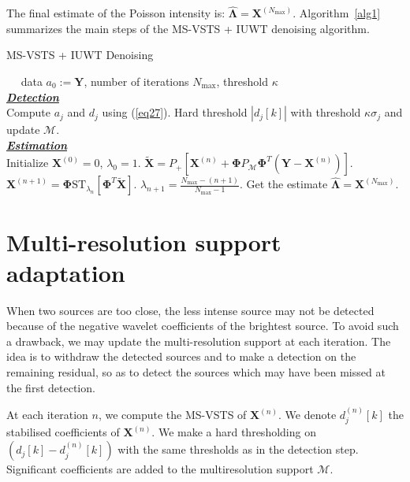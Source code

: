 The final estimate of the Poisson intensity is: $\hat{\mathbf{\Lambda}} = \mathbf{X}^{(N_{\max})}$. Algorithm~\ref{alg1} summarizes the main steps of the MS-VSTS + IUWT denoising algorithm.



\begin{algorithm}[!h]
\caption{MS-VSTS + IUWT Denoising}
\label{alg1}
\begin{algorithmic}[1]
\REQUIRE $\quad$ data $a_0:=\mathbf{Y}$, number of iterations $N_{\max}$, threshold $\kappa$ \\
\underline{\emph{\textbf{Detection}}} \\
\STATE Compute $a_j$ and $d_j$ using (\ref{eq27}).
\STATE Hard threshold $|d_j[k]|$ with threshold $\kappa \sigma_j$ and update $\mathcal{M}$.
\ENDFOR \\
\underline{\emph{\textbf{Estimation}}} \\
\STATE Initialize $\mathbf{X}^{(0)}=0$, $\lambda_0 = 1$.
\STATE $\tilde{\mathbf{X}}= P_{+}[\mathbf{ X}^{(n)} + \mathbf{ \Phi} P_{\mathcal{M}} \mathbf{ \Phi}^{T} (\mathbf{ Y} - \mathbf{ X}^{(n)})]$.
\STATE $\mathbf{X}^{(n+1)} = \mathbf{ \Phi}\text{ST}_{\lambda_n}[\mathbf{ \Phi}^{T}\tilde{\mathbf{X}}]$.
\STATE $\lambda_{n+1} = \frac{N_{\max} - (n+1)}{N_{\max} - 1}$.
\ENDFOR
\STATE Get the estimate $\hat{\mathbf{\Lambda}} = \mathbf{X}^{(N_{\max})}$.

\end{algorithmic}
\end{algorithm}


\section{Multi-resolution support adaptation}

When two sources are too close, the less intense source may not be detected because of the negative wavelet coefficients of the brightest source. To avoid such a drawback, we may update the multi-resolution support at each iteration. The idea is to withdraw the detected sources and to make a detection on the remaining residual, so as to detect the sources which may have been missed at the first detection.


At each iteration $n$, we compute the MS-VSTS of $\mathbf{X}^{(n)}$. We denote $d^{(n)}_j[k]$ the stabilised coefficients of $\mathbf{X}^{(n)}$. We make a hard thresholding on $(d_j[k]-d^{(n)}_j[k])$ with the same thresholds as in the detection step. Significant coefficients are added to the multiresolution support $\mathcal{M}$.

